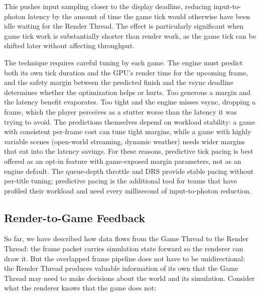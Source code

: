 \documentclass[
  11pt,
  letterpaper,
  DIV=11,
  numbers=noendperiod,
  twoside,
  open=right]{scrreprt}
\begin{document}
This pushes input sampling closer to the display deadline, reducing
input-to-photon latency by the amount of time the game tick would
otherwise have been idle waiting for the Render Thread. The effect is
particularly significant when game tick work is substantially shorter
than render work, as the game tick can be shifted later without
affecting throughput.

The technique requires careful tuning by each game. The engine must
predict both its own tick duration and the GPU's render time for the
upcoming frame, and the safety margin between the predicted finish and
the vsync deadline determines whether the optimization helps or hurts.
Too generous a margin and the latency benefit evaporates. Too tight and
the engine misses vsync, dropping a frame, which the player perceives as
a stutter worse than the latency it was trying to avoid. The predictions
themselves depend on workload stability: a game with consistent
per-frame cost can tune tight margins, while a game with highly variable
scenes (open-world streaming, dynamic weather) needs wider margins that
eat into the latency savings. For these reasons, predictive tick pacing
is best offered as an opt-in feature with game-exposed margin
parameters, not as an engine default. The queue-depth throttle and DRS
provide stable pacing without per-title tuning; predictive pacing is the
additional tool for teams that have profiled their workload and need
every millisecond of input-to-photon reduction.

\subsection{Render-to-Game Feedback}\label{render-to-game-feedback}

So far, we have described how data flows from the Game Thread to the
Render Thread: the frame packet carries simulation state forward so the
renderer can draw it. But the overlapped frame pipeline does not have to
be unidirectional: the Render Thread produces valuable information of
its own that the Game Thread may need to make decisions about the world
and its simulation. Consider what the renderer knows that the game does
not:
\end{document}
